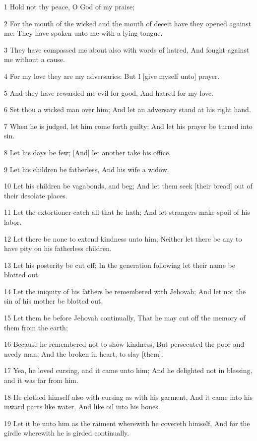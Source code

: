 \par 1 Hold not thy peace, O God of my praise;
\par 2 For the mouth of the wicked and the mouth of deceit have they opened against me: They have spoken unto me with a lying tongue.
\par 3 They have compassed me about also with words of hatred, And fought against me without a cause.
\par 4 For my love they are my adversaries: But I [give myself unto] prayer.
\par 5 And they have rewarded me evil for good, And hatred for my love.
\par 6 Set thou a wicked man over him; And let an adversary stand at his right hand.
\par 7 When he is judged, let him come forth guilty; And let his prayer be turned into sin.
\par 8 Let his days be few; [And] let another take his office.
\par 9 Let his children be fatherless, And his wife a widow.
\par 10 Let his children be vagabonds, and beg; And let them seek [their bread] out of their desolate places.
\par 11 Let the extortioner catch all that he hath; And let strangers make spoil of his labor.
\par 12 Let there be none to extend kindness unto him; Neither let there be any to have pity on his fatherless children.
\par 13 Let his posterity be cut off; In the generation following let their name be blotted out.
\par 14 Let the iniquity of his fathers be remembered with Jehovah; And let not the sin of his mother be blotted out.
\par 15 Let them be before Jehovah continually, That he may cut off the memory of them from the earth;
\par 16 Because he remembered not to show kindness, But persecuted the poor and needy man, And the broken in heart, to slay [them].
\par 17 Yea, he loved cursing, and it came unto him; And he delighted not in blessing, and it was far from him.
\par 18 He clothed himself also with cursing as with his garment, And it came into his inward parts like water, And like oil into his bones.
\par 19 Let it be unto him as the raiment wherewith he covereth himself, And for the girdle wherewith he is girded continually.
